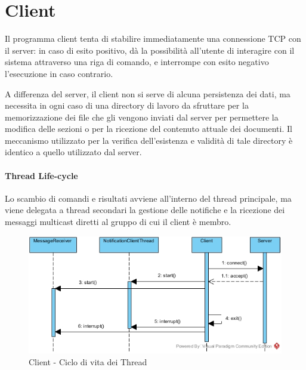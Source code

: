 \section{Client}
Il programma client tenta di stabilire immediatamente una connessione TCP con il server: in caso di esito positivo, dà la possibilità all'utente di interagire con il sistema attraverso una riga di comando, e interrompe con esito negativo l'esecuzione in caso contrario.

A differenza del server, il client non si serve di alcuna persistenza dei dati, ma necessita in ogni caso di una directory di lavoro da sfruttare per la memorizzazione dei file che gli vengono inviati dal server per permettere la modifica delle sezioni o per la ricezione del contenuto attuale dei documenti. Il meccanismo utilizzato per la verifica dell'esistenza e validità di tale directory è identico a quello utilizzato dal server.

\paragraph{Thread Life-cycle}
Lo scambio di comandi e risultati avviene all'interno del thread principale, ma viene delegata a thread secondari la gestione delle notifiche e la ricezione dei messaggi multicast diretti al gruppo di cui il client è membro.

\begin{figure}[h]
	\caption{Client - Ciclo di vita dei Thread}
	\centering
	\includegraphics[scale=0.5]{assets/client/thread_activation_sequence_diagram}
\end{figure}
